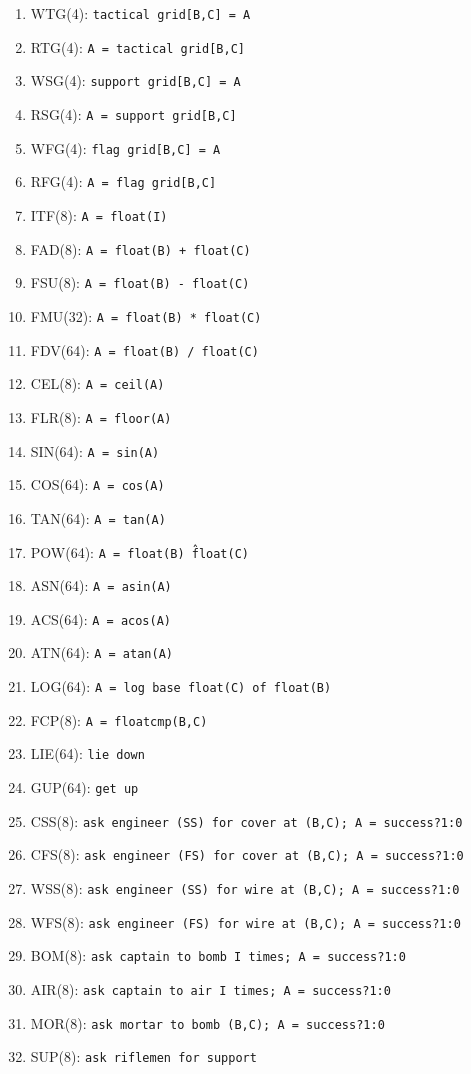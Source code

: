 \documentclass{article}
\begin{document}
\begin{enumerate}[noitemsep]
    \item WTG(4): \texttt{tactical grid[B,C] = A}
    \item RTG(4): \texttt{A = tactical grid[B,C]}
    \item WSG(4): \texttt{support grid[B,C] = A}
    \item RSG(4): \texttt{A = support grid[B,C]}
    \item WFG(4): \texttt{flag grid[B,C] = A}
    \item RFG(4): \texttt{A = flag grid[B,C]}
    \item ITF(8): \texttt{A = float(I)}
    \item FAD(8): \texttt{A = float(B) + float(C)}
    \item FSU(8): \texttt{A = float(B) - float(C)}
    \item FMU(32): \texttt{A = float(B) * float(C)}
    \item FDV(64): \texttt{A = float(B) / float(C)}
    \item CEL(8): \texttt{A = ceil(A)}
    \item FLR(8): \texttt{A = floor(A)}
    \item SIN(64): \texttt{A = sin(A)}
    \item COS(64): \texttt{A = cos(A)}
    \item TAN(64): \texttt{A = tan(A)}
    \item POW(64): \texttt{A = float(B) \^ float(C)}
    \item ASN(64): \texttt{A = asin(A)}
    \item ACS(64): \texttt{A = acos(A)}
    \item ATN(64): \texttt{A = atan(A)}
    \item LOG(64): \texttt{A = log base float(C) of float(B)}
    \item FCP(8): \texttt{A = floatcmp(B,C)}
    \item LIE(64): \texttt{lie down}
    \item GUP(64): \texttt{get up}
    \item CSS(8): \texttt{ask engineer (SS) for cover at (B,C); A = success?1:0}
    \item CFS(8): \texttt{ask engineer (FS) for cover at (B,C); A = success?1:0}
    \item WSS(8): \texttt{ask engineer (SS) for wire at (B,C); A = success?1:0}
    \item WFS(8): \texttt{ask engineer (FS) for wire at (B,C); A = success?1:0}
    \item BOM(8): \texttt{ask captain to bomb I times; A = success?1:0}
    \item AIR(8): \texttt{ask captain to air I times; A = success?1:0}
    \item MOR(8): \texttt{ask mortar to bomb (B,C); A = success?1:0}
    \item SUP(8): \texttt{ask riflemen for support}
\end{enumerate}
\end{document}
